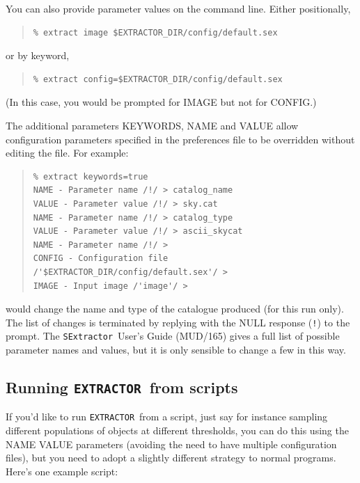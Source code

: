 \documentclass[twoside,11pt]{article}
\newcommand{\htmladdnormallink}[2]{#1}
\newcommand{\latex}[1]{#1}
\renewcommand{\_}{\texttt{\symbol{95}}}
\newcommand{\EXTRACTOR}{\texttt{EXTRACTOR}}
\newcommand{\SExtractor}{\texttt{SExtractor}}
\newcommand{\MUD}{mud165.ps}
\begin{document}
You can also provide parameter values on the command line.
Either positionally,
\begin{quote} \begin{verbatim}
% extract image $EXTRACTOR_DIR/config/default.sex
\end{verbatim} \end{quote}
or by keyword,
\begin{quote} \begin{verbatim}
% extract config=$EXTRACTOR_DIR/config/default.sex
\end{verbatim} \end{quote}
(In this case, you would be prompted for IMAGE but not for CONFIG.)

The additional parameters KEYWORDS, NAME and VALUE allow
configuration parameters specified in the preferences file to be overridden
without editing the file. For example:
\begin{quote} \begin{verbatim}
% extract keywords=true
NAME - Parameter name /!/ > catalog_name
VALUE - Parameter value /!/ > sky.cat
NAME - Parameter name /!/ > catalog_type
VALUE - Parameter value /!/ > ascii_skycat
NAME - Parameter name /!/ >
CONFIG - Configuration file /'$EXTRACTOR_DIR/config/default.sex'/ >
IMAGE - Input image /'image'/ >
\end{verbatim} \end{quote}
would change the name and type of the catalogue produced (for this
run only). The list of changes is terminated by replying with the NULL
response (\texttt{!}) to the prompt.
The
\htmladdnormallink{\SExtractor\ User's Guide}{\MUD}\latex{ (MUD/165)}
gives a full list of possible parameter names and values, but it is only
sensible to change a few in this way.

\subsection{Running \EXTRACTOR\ from scripts}
If you'd like to run \EXTRACTOR\ from a script, just say for instance
sampling different populations of objects at different thresholds, you
can do this using the NAME VALUE parameters (avoiding the need to have
multiple configuration files), but you need to adopt a slightly
different strategy to normal programs. Here's one example script:
\end{document}
